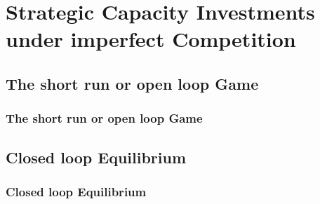 \section{Strategic Capacity Investments under imperfect Competition}

\subsection{The short run or open loop Game}

					\begin{frame}
					
\frametitle{The short run or open loop Game}

							\end{frame}

\subsection{Closed loop Equilibrium}

					\begin{frame}
					
\frametitle{Closed loop Equilibrium}

							\end{frame}